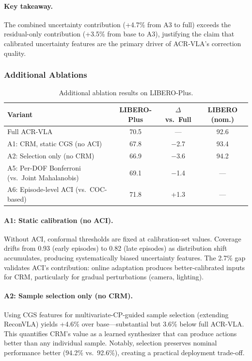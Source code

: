 \documentclass[letterpaper]{article}
\begin{document}
\paragraph{Key takeaway.}
The combined uncertainty contribution (+4.7\% from A3 to full) exceeds the residual-only contribution (+3.5\% from base to A3), justifying the claim that calibrated uncertainty features are the primary driver of ACR-VLA's correction quality.

\subsubsection{Additional Ablations}

\begin{table}[h]
\centering
\caption{Additional ablation results on LIBERO-Plus.}
\label{tab:ablation_additional}
\begin{tabular}{lccc}
\toprule
Variant & LIBERO-Plus & $\Delta$ vs.\ Full & LIBERO (nom.) \\
\midrule
Full ACR-VLA & 70.5 & --- & 92.6 \\
\midrule
A1: CRM, static CGS (no ACI) & 67.8 & $-$2.7 & 93.4 \\
A2: Selection only (no CRM) & 66.9 & $-$3.6 & 94.2 \\
\midrule
A5: Per-DOF Bonferroni (vs.\ Joint Mahalanobis) & 69.1 & $-$1.4 & --- \\
A6: Episode-level ACI (vs.\ COC-based) & 71.8 & +1.3 & --- \\
\bottomrule
\end{tabular}
\end{table}

\paragraph{A1: Static calibration (no ACI).}
Without ACI, conformal thresholds are fixed at calibration-set values.
Coverage drifts from 0.93 (early episodes) to 0.82 (late episodes) as distribution shift accumulates, producing systematically biased uncertainty features.
The 2.7\% gap validates ACI's contribution: online adaptation produces better-calibrated inputs for CRM, particularly for gradual perturbations (camera, lighting).

\paragraph{A2: Sample selection only (no CRM).}
Using CGS features for multivariate-CP-guided sample selection (extending ReconVLA) yields +4.6\% over base---substantial but 3.6\% below full ACR-VLA.
This quantifies CRM's value as a learned synthesizer that can produce actions better than any individual sample.
Notably, selection preserves nominal performance better (94.2\% vs.\ 92.6\%), creating a practical deployment trade-off.
\end{document}
